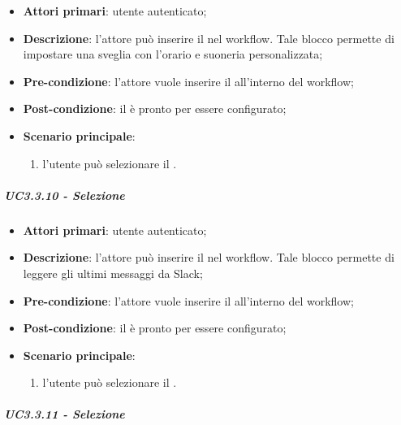 \begin{itemize}
\item \textbf{Attori primari}: utente autenticato;

\item \textbf{Descrizione}: l'attore può inserire il \BSveglia{} nel workflow. Tale blocco permette di impostare una sveglia con l'orario e suoneria personalizzata;

\item \textbf{Pre-condizione}: l'attore vuole inserire il \BSveglia{} all'interno del workflow;

\item \textbf{Post-condizione}: il \BSveglia{} è pronto per essere configurato;

\item \textbf{Scenario principale}:
\begin{enumerate}
\item l'utente può selezionare il \BSveglia{}.

\end{enumerate}
\end{itemize}

\subparagraph{UC3.3.10 - Selezione \BSlack{}}

\begin{itemize}
\item \textbf{Attori primari}: utente autenticato;

\item \textbf{Descrizione}: l'attore può inserire il \BSlack{} nel workflow. Tale blocco permette di leggere gli ultimi messaggi da Slack;

\item \textbf{Pre-condizione}: l'attore vuole inserire il \BSlack{} all'interno del workflow;

\item \textbf{Post-condizione}: il \BSlack{} è pronto per essere configurato;

\item \textbf{Scenario principale}:
\begin{enumerate}
\item l'utente può selezionare il \BSlack{}.

\end{enumerate}
\end{itemize}

\subparagraph{UC3.3.11 - Selezione \BTelegram{}}

